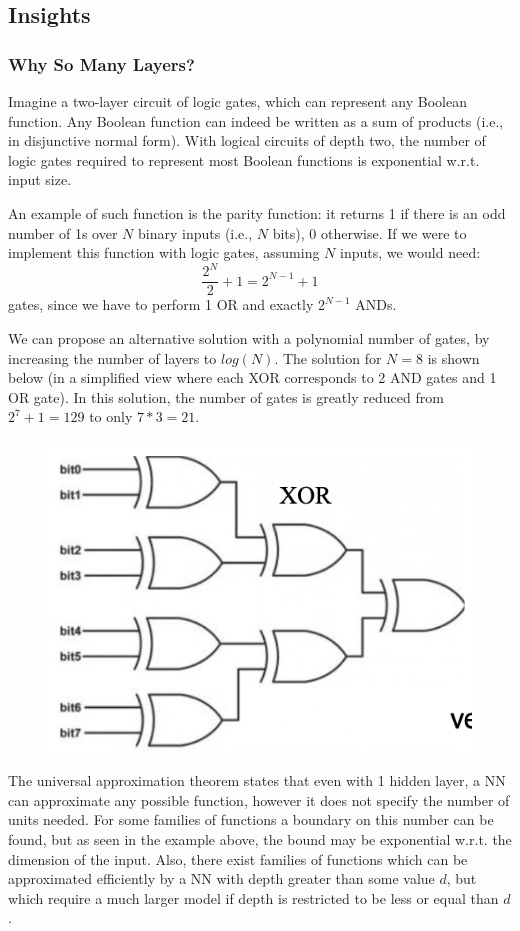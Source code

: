 \subsection{Insights}

\subsubsection{Why So Many Layers?}

Imagine a two-layer circuit of logic gates, which can represent any Boolean function. Any Boolean function can indeed be written as a sum of products (i.e., in disjunctive normal form). With logical circuits of depth two, the number of logic gates required to represent most Boolean functions is exponential w.r.t. input size.

An example of such function is the parity function: it returns 1 if there is an odd number of 1s over $N$ binary inputs (i.e., $N$ bits), 0 otherwise. If we were to implement this function with logic gates, assuming $N$ inputs, we would need:
\begin{equation*}
    \dfrac{2^N}{2} + 1 = 2^{N-1} + 1
\end{equation*}
gates, since we have to perform 1 OR and exactly $2^{N-1}$ ANDs.

We can propose an alternative solution with a polynomial number of gates, by increasing the number of layers to $log(N)$. The solution for $N=8$ is shown below (in a simplified view where each XOR corresponds to 2 AND gates and 1 OR gate). In this solution, the number of gates is greatly reduced from $2^7 + 1 = 129$ to only $7 * 3 = 21$.
\begin{figure}[ht]
    \centering
    \includegraphics[width=0.5\linewidth]{img/Circuit_deep.png}
\end{figure}

The universal approximation theorem states that even with 1 hidden layer, a NN can approximate any possible function, however it does not specify the number of units needed. For some families of functions a boundary on this number can be found, but as seen in the example above, the bound may be exponential w.r.t. the dimension of the input. Also, there exist families of functions which can be approximated efficiently by a NN with depth greater than some value $d$, but which require a much larger model if depth is restricted to be less or equal than $d$.

